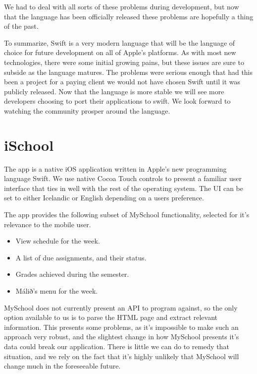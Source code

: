 \documentclass[pdftex, DIV=calc, paper=a4, fontsize=11pt]{scrartcl}	 %
\begin{document}
We had to deal with all sorts of these problems during development, but now that the language has 
been officially released these problems are hopefully a thing of the past.

To summarize, Swift is a very modern language that will be the language of choice for future 
development on all of Apple's platforms. As with most new technologies, there were some initial
growing pains, but these issues are sure to subside as the language matures. The problems were 
serious enough that had this been a project for a paying client we would not have chosen Swift
until it was publicly released. Now that the language is more stable we will see more
developers choosing to port their applications to swift. 
We look forward to watching the community prosper around the language.


\section{iSchool}
\label{sec:ischool}

The app is a native iOS application written in Apple's new programming language Swift.
We use native Cocoa Touch controls to present a familiar user interface that ties in well with
the rest of the operating system. The UI can be set to either Icelandic or English depending on a 
users preference.

The app provides the following subset of MySchool functionality, selected for it's relevance to
the mobile user.

\begin{itemize}
    \item View schedule for the week.
    \item A list of due assignments, and their status.
    \item Grades achieved during the semester.
    \item Málið's menu for the week.
\end{itemize}


MySchool does not currently present an API to program against, so the only option available to us
is to parse the HTML page and extract relevant information. This presents some problems, as it's 
impossible to make such an approach very robust, and the slightest change in how MySchool presents
it's data could break our application. There is little we can do to remedy that situation, and we
rely on the fact that it's highly unlikely that MySchool will change much in the foreseeable future.
\end{document}
